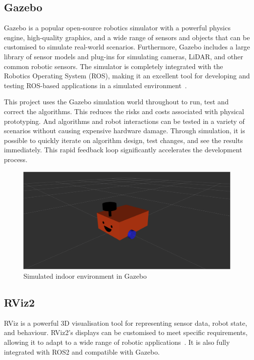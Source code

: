 \subsection{Gazebo}
Gazebo is a popular open-source robotics simulator with a powerful physics engine, high-quality graphics, 
and a wide range of sensors and objects that can be customised to simulate real-world scenarios. 
Furthermore, Gazebo includes a large library of sensor models and plug-ins for simulating cameras, LiDAR, 
and other common robotic sensors. The simulator is completely integrated with the Robotics Operating System (ROS), 
making it an excellent tool for developing and testing ROS-based applications in a simulated environment~\cite{gazebo}. 

This project uses the Gazebo simulation world throughout to run, test and correct the algorithms. 
This reduces the risks and costs associated with physical prototyping. 
And algorithms and robot interactions can be tested in a variety of scenarios without causing expensive hardware damage. 
Through simulation, it is possible to quickly iterate on algorithm design, test changes, and see the results immediately. 
This rapid feedback loop significantly accelerates the development process.
\begin{figure}[H]
    \centering
    \includegraphics[width=0.8\linewidth]{figs/robot.png}
    \caption{Simulated indoor environment in Gazebo}
\end{figure}
\subsection{RViz2}
RViz is a powerful 3D visualisation tool for representing sensor data, robot state, and behaviour.
RViz2's displays can be customised to meet specific requirements, 
allowing it to adapt to a wide range of robotic applications~\cite{rviz2}. 
It is also fully integrated with ROS2 and compatible with Gazebo. 

